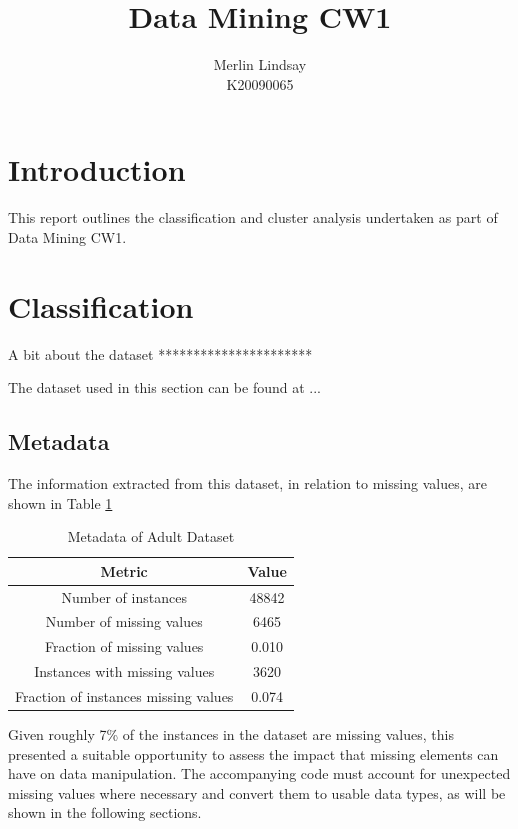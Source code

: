 \documentclass{article}
\title{Data Mining CW1}
\author{Merlin Lindsay\\
        \small  K20090065 
}
\date{}
\begin{document}
\maketitle

\section*{Introduction}

This report outlines the classification and cluster analysis undertaken as part of Data Mining CW1.


\section{Classification}

A bit about the dataset ********************** 

The dataset used in this section can be found at ... 

\subsection{Metadata}
The information extracted from this dataset, in relation to missing values, are shown in Table \ref{table:metAdult}\\
\vspace{2mm}

\begin{table}
        \label{table:metAdult}
        \centering
\begin{tabular}{ |c|c|}
        \hline
        Metric & Value\\
        \hline
        Number of instances & 48842\\
        Number of missing values & 6465\\
        Fraction of missing values & 0.010\\
        Instances with missing values & 3620\\
        Fraction of instances missing values & 0.074\\
        \hline
       \end{tabular}
\caption{Metadata of Adult Dataset}
\end{table}
\vspace{2mm}
Given roughly 7\% of the instances in the dataset are missing values, this presented a suitable opportunity to assess the impact 
that missing elements can have on data manipulation. The accompanying code must account for unexpected missing values
where necessary and convert them to usable data types, as will be shown in the following sections.
\end{document}
